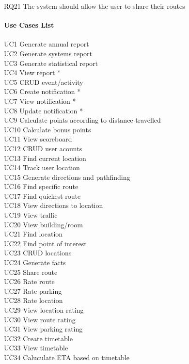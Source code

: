 \documentclass{article}
\begin{document}
{			RQ21 The system should allow the user to share their routes\\\\
			\noindent\textbf{Use Cases List}\\\\
			UC1 Generate annual report\\
			UC2 Generate systems report\\
			UC3 Generate statistical report\\
			UC4  View report *\\
			UC5 CRUD event/activity\\
			UC6 Create notification *\\
			UC7 View notification *\\
			UC8 Update notification *\\
			UC9 Calculate points according to distance travelled\\
			UC10 Calculate bonus points\\
			UC11 View scoreboard\\
			UC12 CRUD user acounts\\
			UC13 Find current location\\
			UC14 Track user location\\
			UC15 Generate directions and pathfinding\\
			UC16 Find specific route\\
			UC17 Find quickest route\\
			UC18 View directions to location\\
			UC19 View traffic\\
			UC20 View building/room\\
			UC21 Find location\\
			UC22 Find point of interest\\
			UC23 CRUD locations\\
			UC24 Generate facts\\
			UC25 Share route\\
			UC26 Rate route\\
			UC27 Rate parking\\
			UC28 Rate location\\
			UC29 View location rating\\
			UC30 View route rating\\
			UC31 View parking rating\\
			UC32 Create timetable\\
			UC33 View timetable\\
			UC34 Caluculate ETA based on timetable\\
}
\end{document}
